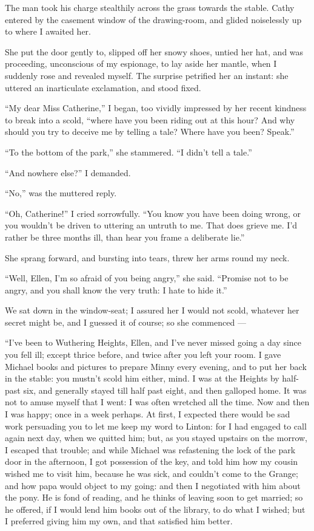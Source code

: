 \par The man took his charge stealthily across the grass towards the stable. Cathy entered by the casement window of the drawing-room, and glided noiselessly up to where I awaited her.
\par She put the door gently to, slipped off her snowy shoes, untied her hat, and was proceeding, unconscious of my espionage, to lay aside her mantle, when I suddenly rose and revealed myself. The surprise petrified her an instant: she uttered an inarticulate exclamation, and stood fixed.
\par “My dear Miss Catherine,” I began, too vividly impressed by her recent kindness to break into a scold, “where have you been riding out at this hour? And why should you try to deceive me by telling a tale? Where have you been? Speak.”
\par “To the bottom of the park,” she stammered. “I didn't tell a tale.”
\par “And nowhere else?” I demanded.
\par “No,” was the muttered reply.
\par “Oh, Catherine!” I cried sorrowfully. “You know you have been doing wrong, or you wouldn't be driven to uttering an untruth to me. That does grieve me. I'd rather be three months ill, than hear you frame a deliberate lie.”
\par She sprang forward, and bursting into tears, threw her arms round my neck.
\par “Well, Ellen, I'm so afraid of you being angry,” she said. “Promise not to be angry, and you shall know the very truth: I hate to hide it.”
\par We sat down in the window-seat; I assured her I would not scold, whatever her secret might be, and I guessed it of course; so she commenced —
\par “I've been to Wuthering Heights, Ellen, and I've never missed going a day since you fell ill; except thrice before, and twice after you left your room. I gave Michael books and pictures to prepare Minny every evening, and to put her back in the stable: you mustn't scold him either, mind. I was at the Heights by half-past six, and generally stayed till half past eight, and then galloped home. It was not to amuse myself that I went: I was often wretched all the time. Now and then I was happy; once in a week perhaps. At first, I expected there would be sad work persuading you to let me keep my word to Linton: for I had engaged to call again next day, when we quitted him; but, as you stayed upstairs on the morrow, I escaped that trouble; and while Michael was refastening the lock of the park door in the afternoon, I got possession of the key, and told him how my cousin wished me to visit him, because he was sick, and couldn't come to the Grange; and how papa would object to my going: and then I negotiated with him about the pony. He is fond of reading, and he thinks of leaving soon to get married; so he offered, if I would lend him books out of the library, to do what I wished; but I preferred giving him my own, and that satisfied him better.

